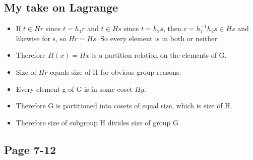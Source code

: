 \documentclass[11pt, oneside]{article}   	%
\begin{document}
\subsection {My take on Lagrange}

\begin{itemize}
\item If $t \in Hr$ since $t = h_1r$ and $t \in Hs$ since $t=h_2s$, then $r = h_1^{-1}h_2s \in Hs$ and likewise for s, so $Hr = Hs$.  So every element is in both or neither.
\item Therefore $H(x) = Hx$ is a partition relation on the elements of G.
\item Size of $Hr$ equals size of H for obvious group reasons.
\item Every element g of G is in some coset $Hg$.  
\item Therefore G is partitioned into cosets of equal size, which is size of H.
\item Therefore size of subgroup H divides size of group G
\end{itemize}

\begin{comment}

* Cosets form equivalence classes
** Hr and Hs share either one element (identity) or all elements.
*** Suppose t in Hr and Hs, and t is not identity.
*** Then t = h_1*r = h_2 * s
*** Suppose r, s in H.  Then equal.
*** Suppose 
* Cosets are the same size
* Size of cosets divide group size
* Therefore size of He = H divides group size
\end{comment}

\subsection {Page 7-12}
\end{document}
